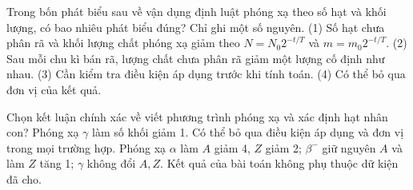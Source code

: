 \begin{ex}
Trong bốn phát biểu sau về vận dụng định luật phóng xạ theo số hạt và khối lượng, có bao nhiêu phát biểu đúng? Chỉ ghi một số nguyên. (1) Số hạt chưa phân rã và khối lượng chất phóng xạ giảm theo $N=N_0 2^{-t/T}$ và $m=m_0 2^{-t/T}$. (2) Sau mỗi chu kì bán rã, lượng chất chưa phân rã giảm một lượng cố định như nhau. (3) Cần kiểm tra điều kiện áp dụng trước khi tính toán. (4) Có thể bỏ qua đơn vị của kết quả.
\end{ex}

\begin{ex}
Chọn kết luận chính xác về viết phương trình phóng xạ và xác định hạt nhân con?
\choice
{Phóng xạ $\gamma$ làm số khối giảm 1.}
{Có thể bỏ qua điều kiện áp dụng và đơn vị trong mọi trường hợp.}
{\True Phóng xạ $\alpha$ làm $A$ giảm 4, $Z$ giảm 2; $\beta^-$ giữ nguyên $A$ và làm $Z$ tăng 1; $\gamma$ không đổi $A,Z$.}
{Kết quả của bài toán không phụ thuộc dữ kiện đã cho.}
\end{ex}

